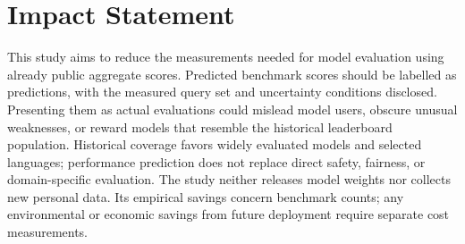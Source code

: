 \documentclass{article}
\begin{document}
\printAffiliationsAndNotice{}

\clearpage
\section*{Impact Statement}
This study aims to reduce the measurements needed for model evaluation using already public aggregate scores. Predicted benchmark scores should be labelled as predictions, with the measured query set and uncertainty conditions disclosed. Presenting them as actual evaluations could mislead model users, obscure unusual weaknesses, or reward models that resemble the historical leaderboard population. Historical coverage favors widely evaluated models and selected languages; performance prediction does not replace direct safety, fairness, or domain-specific evaluation. The study neither releases model weights nor collects new personal data. Its empirical savings concern benchmark counts; any environmental or economic savings from future deployment require separate cost measurements.


\clearpage
\appendix
\onecolumn

\end{document}
